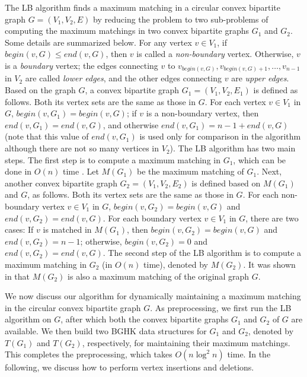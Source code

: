 \documentclass[11pt]{article}
\begin{document}
The LB algorithm \cite{ref:LiangCi95} finds a maximum matching in
a circular convex bipartite graph $G=(V_1,V_2,E)$ by reducing the
problem to two sub-problems of computing the maximum matchings in two
convex bipartite graphs $G_1$ and $G_2$. Some details are summarized
below. For any vertex $v\in V_1$, if $begin(v,G)\leq end(v,G)$, then
$v$ is called a {\em non-boundary} vertex. Otherwise, $v$ is a {\em
boundary} vertex; the edges connecting $v$ to
$v_{begin(v,G)},v_{begin(v,G)+1},\ldots,v_{n-1}$ in $V_2$ are called {\em lower
edges}, and the other edges connecting $v$ are {\em upper edges}.
Based on the graph $G$, a convex bipartite graph
$G_1=(V_1,V_2,E_1)$ is defined as follows. Both its vertex sets are
the same as those in $G$. For each vertex $v\in V_1$ in $G$,
$begin(v,G_1)=begin(v,G)$; if $v$ is a non-boundary vertex,
then $end(v,G_1)=end(v,G)$, and otherwise $end(v,G_1)=n-1+end(v,G)$ (note
that this value of $end(v,G_1)$ is used only for comparison in the algorithm
although there are not so many vertices in $V_2$). The LB
algorithm has two main steps. The first step is to compute a
maximum matching in $G_1$, which can be done in $O(n)$ time
\cite{ref:GabowA85,ref:LipskiEf81,ref:SteinerA96}. Let $M(G_1)$ be
the maximum matching of $G_1$. Next, another convex
bipartite graph $G_2=(V_1,V_2,E_2)$ is defined based on $M(G_1)$ and $G$, as
follows. Both its vertex sets are the same as those in $G$. For each
non-boundary vertex $v\in V_1$ in $G$, $begin(v,G_2)=begin(v,G)$ and
$end(v,G_2)=end(v,G)$. For each boundary vertex $v\in V_1$ in $G$,
there are two cases: If $v$ is matched in $M(G_1)$, then
$begin(v,G_2)=begin(v,G)$ and $end(v,G_2)=n-1$; otherwise,
$begin(v,G_2)=0$ and $end(v,G_2)=end(v,G)$. The second step of the LB
algorithm is to compute a maximum matching in $G_2$ (in $O(n)$
time), denoted by $M(G_2)$. It was shown in \cite{ref:LiangCi95}
that $M(G_2)$ is also a maximum matching of the original graph $G$.




We now discuss our algorithm for dynamically maintaining a
maximum matching in the circular convex bipartite graph $G$. As
preprocessing, we first run the LB algorithm on $G$, after which
both the convex bipartite graphs $G_1$ and $G_2$ of $G$ are
available. We then build two BGHK data structures for $G_1$ and
$G_2$, denoted by $T(G_1)$ and $T(G_2)$, respectively, for
maintaining their maximum matchings. This completes the preprocessing,
which takes $O(n\log^2 n)$ time. In the following, we discuss how to perform
vertex insertions and deletions.
\end{document}
